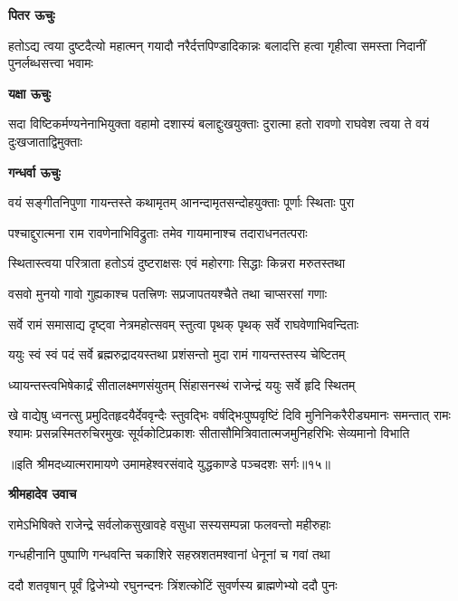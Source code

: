 \textbf{पितर ऊचुः}

\fourlineindentedshloka
{हतोऽद्य त्वया दुष्टदैत्यो महात्मन्}
{गयादौ नरैर्दत्तपिण्डादिकान्नः}
{बलादत्ति हत्वा गृहीत्वा समस्ता\-}
{निदानीं पुनर्लब्धसत्त्वा भवामः} %

\textbf{यक्षा ऊचुः}

\fourlineindentedshloka
{सदा विष्टिकर्मण्यनेनाभियुक्ता}
{वहामो दशास्यं बलाद्दुःखयुक्ताः}
{दुरात्मा हतो रावणो राघवेश}
{त्वया ते वयं दुःखजाताद्विमुक्ताः} %

\textbf{गन्धर्वा ऊचुः}

\twolineshloka
{वयं सङ्गीतनिपुणा गायन्तस्ते कथामृतम्}
{आनन्दामृतसन्दोहयुक्ताः पूर्णाः स्थिताः पुरा} %

\twolineshloka
{पश्चाद्दुरात्मना राम रावणेनाभिविद्रुताः}
{तमेव गायमानाश्च तदाराधनतत्पराः} %

\twolineshloka
{स्थितास्त्वया परित्राता हतोऽयं दुष्टराक्षसः}
{एवं महोरगाः सिद्धाः किन्नरा मरुतस्तथा} %

\twolineshloka
{वसवो मुनयो गावो गुह्यकाश्च पतत्त्रिणः}
{सप्रजापतयश्चैते तथा चाप्सरसां गणाः} %

\twolineshloka
{सर्वे रामं समासाद्य दृष्ट्वा नेत्रमहोत्सवम्}
{स्तुत्वा पृथक् पृथक् सर्वे राघवेणाभिवन्दिताः} %

\twolineshloka
{ययुः स्वं स्वं पदं सर्वे ब्रह्मरुद्रादयस्तथा}
{प्रशंसन्तो मुदा रामं गायन्तस्तस्य चेष्टितम्} %

\twolineshloka
{ध्यायन्तस्त्वभिषेकार्द्रं सीतालक्ष्मणसंयुतम्}
{सिंहासनस्थं राजेन्द्रं ययुः सर्वे हृदि स्थितम्} %

\fourlineindentedshloka
{खे वाद्येषु ध्वनत्सु प्रमुदितहृदयैर्देववृन्दैः स्तुवद्भिः}
{वर्षद्भिःपुष्पवृष्टिं दिवि मुनिनिकरैरीड्यमानः समन्तात्}
{रामः श्यामः प्रसन्नस्मितरुचिरमुखः सूर्यकोटिप्रकाशः}
{सीतासौमित्रिवातात्मजमुनिहरिभिः सेव्यमानो विभाति} %

{॥इति श्रीमदध्यात्मरामायणे उमामहेश्वरसंवादे युद्धकाण्डे
पञ्चदशः सर्गः॥१५॥
}




\textbf{श्रीमहादेव उवाच}

\twolineshloka
{रामेऽभिषिक्ते राजेन्द्रे सर्वलोकसुखावहे}
{वसुधा सस्यसम्पन्ना फलवन्तो महीरुहाः} %

\twolineshloka
{गन्धहीनानि पुष्पाणि गन्धवन्ति चकाशिरे}
{सहस्रशतमश्वानां धेनूनां च गवां तथा} %

\twolineshloka
{ददौ शतवृषान् पूर्वं द्विजेभ्यो रघुनन्दनः}
{त्रिंशत्कोटिं सुवर्णस्य ब्राह्मणेभ्यो ददौ पुनः} %

